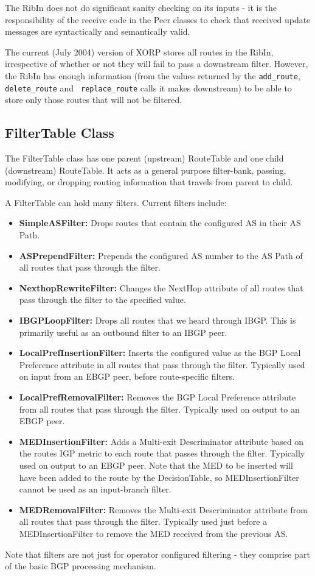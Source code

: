 \documentclass[11pt]{article}
\begin{document}
The RibIn does not do significant sanity checking on its inputs - it
is the responsibility of the receive code in the Peer classes to check
that received update messages are syntactically and semantically
valid.

The current (July 2004) version of XORP stores all routes in the RibIn,
irrespective of whether or not they will fail to pass a downstream
filter.  However, the RibIn has enough information (from the values
returned by the {\tt add\_route}, {\tt delete\_route} and {\tt
replace\_route} calls it makes downstream) to be able to store only
those routes that will not be filtered.

\subsection{FilterTable Class}

The FilterTable class has one parent (upstream) RouteTable and one
child (downstream) RouteTable.  It acts as a general purpose
filter-bank, passing, modifying, or dropping routing information that
travels from parent to child.

A FilterTable can hold many filters.  Current filters include:
\begin{itemize}
\item {\bf SimpleASFilter:}  Drops routes that contain the configured
AS in their AS Path.
\item {\bf ASPrependFilter:} Prepends the configured AS number to the
AS Path of all
routes that pass through the filter.
\item {\bf NexthopRewriteFilter:} Changes the NextHop attribute of all
routes that pass through the filter to the specified value.
\item {\bf IBGPLoopFilter:} Drops all routes that we heard through
IBGP.  This is primarily useful as an outbound filter to an IBGP peer.
\item {\bf LocalPrefInsertionFilter:} Inserts the configured value as
the BGP Local Preference attribute in all routes that pass through the
filter.  Typically used on input from an EBGP peer, before
route-specific filters.
\item {\bf LocalPrefRemovalFilter:} Removes the BGP Local Preference
attribute from all routes that pass through the filter.  Typically
used on output to an EBGP peer.
\item {\bf MEDInsertionFilter:} Adds a Multi-exit Descriminator
attribute based on the routes IGP metric to each route that passes
through the filter.  Typically used on output to an EBGP peer.  Note
that the MED to be inserted will have been added to the route by the
DecisionTable, so MEDInsertionFilter cannot be used as an input-branch
filter.
\item {\bf MEDRemovalFilter:} Removes the  Multi-exit Descriminator
attribute from all routes that pass through the filter.  Typically
used just before a MEDInsertionFilter to remove the MED received from
the previous AS.
\end{itemize}
Note that filters are not just for operator configured filtering -
they comprise part of the basic BGP processing mechanism.
\end{document}

